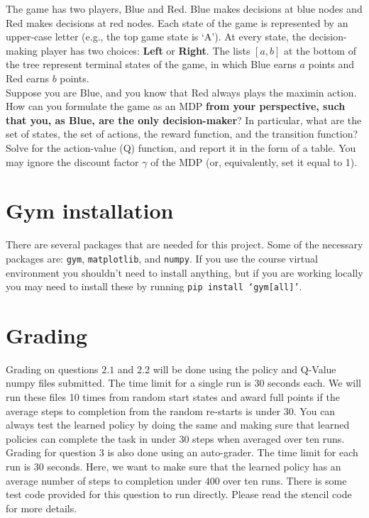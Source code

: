 \documentclass[12pt]{article}
\begin{document}
\begin{enumerate}
    The game has two players, Blue and Red.
    Blue makes decisions at blue nodes and Red makes decisions at red nodes.
    Each state of the game is represented by an upper-case letter (e.g., the top game state is `A').
    At every state, the decision-making player has two choices: \textbf{Left} or \textbf{Right}.
    The lists $[a, b]$ at the bottom of the tree represent terminal states of the game, in which Blue earns $a$ points and Red earns $b$ points. ~\\
    
    Suppose you are Blue, and you know that Red always plays the maximin action.
    How can you formulate the game as an MDP \textbf{from your perspective, such that you, as Blue, are the only decision-maker}?
    In particular, what are the set of states, the set of actions, the reward function, and the transition function?
    Solve for the action-value (Q) function, and report it in the form of a table.
    You may ignore the discount factor $\gamma$ of the MDP (or, equivalently, set it equal to 1).
\end{enumerate}
\section{Gym installation}
\label{gym_install}
There are several packages that are needed for this project. Some of the necessary packages are: \texttt{gym}, \texttt{matplotlib}, and \texttt{numpy}.
If you use the course virtual environment you shouldn't need to install anything, but if you are working locally you may need to install these by running \texttt{pip install `gym[all]'}.

\section{Grading}
Grading on questions $2.1$ and $2.2$ will be done using the policy and Q-Value numpy files submitted. The time limit for a single run is 30 seconds each. We will run these files 10 times from random start states and award full points if the average steps to completion from the random re-starts is under $30$.
You can always test the learned policy by doing the same and making sure that learned policies can complete the task in under $30$ steps when averaged over ten runs. ~\\


Grading for question $3$ is also done using an auto-grader.
The time limit for each run is 30 seconds. Here, we want to make sure that the learned policy has an average number of steps to completion under $400$ over ten runs. There is some test code provided for this question to run directly. Please read the stencil code for more details. ~\\
\end{document}

